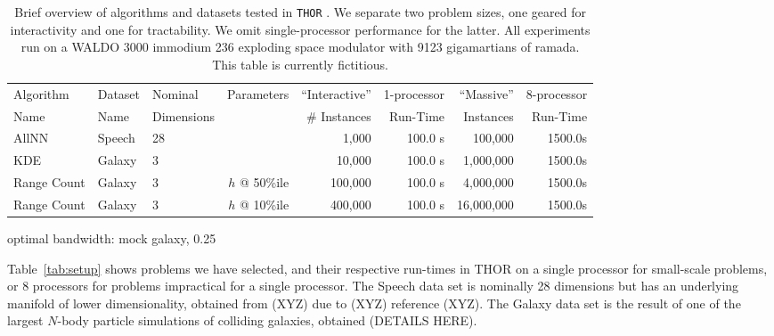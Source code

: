 \documentclass[twoside,leqno,twocolumn]{article}
\newcommand{\THOR}{{{\tt THOR}} }
\begin{document}

\begin{table}
  \begin{tabular}{|l|l|l|r||r|r||r|r|}
    \hline
    Algorithm   & Dataset & Nominal    & Parameters    &  ``Interactive'' & 1-processor &``Massive''   & 8-processor
    \\
    Name        & Name    & Dimensions &               &  \# Instances    & Run-Time    & Instances    & Run-Time
    \\ \hline \hline
    AllNN       & Speech  & 28         &               &  1,000           & 100.0 s     & 100,000      & 1500.0s
    \\ \hline
    KDE         & Galaxy  & 3          &               &  10,000          & 100.0 s     & 1,000,000    & 1500.0s
    \\ \hline
    Range Count & Galaxy  & 3          & $h$ @ 50\%ile &  100,000         & 100.0 s     & 4,000,000    & 1500.0s
    \\ \hline
    Range Count & Galaxy  & 3          & $h$ @ 10\%ile &  400,000         & 100.0 s     & 16,000,000   & 1500.0s
    \\ \hline
  \end{tabular}
  \caption{
  Brief overview of algorithms and datasets tested in \THOR.
  We separate two problem sizes, one geared for interactivity and one for tractability.
  We omit single-processor performance for the latter.
  All experiments run on a WALDO 3000 immodium 236 exploding space modulator with 9123 gigamartians of ramada.
  This table is currently fictitious.
  }
\end{table}

optimal bandwidth: mock galaxy, 0.25

Table~\ref{tab:setup} shows problems we have selected, and their respective run-times in THOR on a single processor for small-scale problems, or 8 processors for problems impractical for a single processor.
The Speech data set is nominally 28 dimensions but has an underlying manifold of lower dimensionality, obtained from (XYZ) due to (XYZ) reference (XYZ).
The Galaxy data set is the result of one of the largest $N$-body particle simulations of colliding galaxies, obtained (DETAILS HERE).
\end{document}

